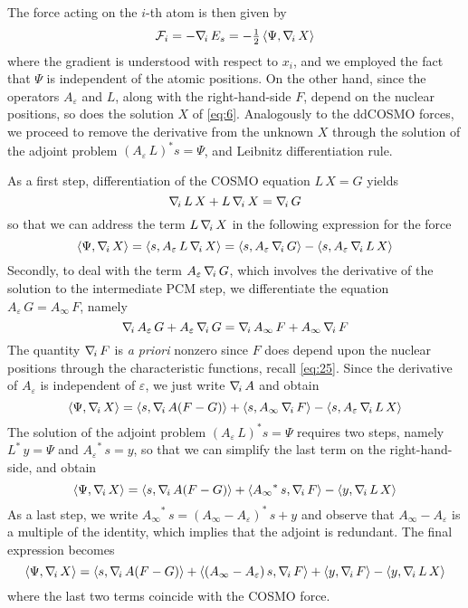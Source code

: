 The force acting on the $i$-th atom is then given by
\[
\mathcal{F}_i = -\nabla_{\!i}\, E_s = - \tfrac{1}{2} 
\,  \langle \Psi, \nabla_{\!i}\, X \rangle 
\]
where the gradient is understood with respect to $x_i$, and we employed the fact that $\Psi$ is independent of the atomic positions. On the other hand, since the operators $A_\varepsilon$ and $L$, along with the right-hand-side $F$, depend on the nuclear positions, so does the solution $X$ of \eqref{eq:6}. Analogously to the ddCOSMO forces, we proceed to remove the derivative from the unknown $X$ through the solution of the adjoint problem $(A_\varepsilon \, L)^* s = \Psi$, and Leibnitz differentiation rule.

As a first step, differentiation of the COSMO equation $L\, X = G$ yields
\[
\nabla_{\!i}\, L \, X + L \, \nabla_{\!i}\, X = \nabla_{\!i}\, G
\]
so that we can address the term $L \, \nabla_{\!i}\, X$ in the following expression for the force
\[
\langle \Psi , \nabla_{\!i}\, X\rangle  = \langle s ,  A_\varepsilon \, L \, \nabla_{\!i}\, X\rangle
 = \langle s ,  A_\varepsilon \, \nabla_{\!i}\, G \rangle - \langle s , A_\varepsilon \, \nabla_{\!i}\, L \,  X \rangle
\]
Secondly, to deal with the term $A_\varepsilon \, \nabla_{\!i}\, G$, which involves the derivative of the solution to the intermediate PCM step, we differentiate the equation $A_\varepsilon \, G = A_\infty \, F$, namely
\[
\nabla_{\!i}\, A_\varepsilon \, G + A_\varepsilon \, \nabla_{\!i}\, G = \nabla_{\!i}\, A_\infty \, F + A_\infty \, \nabla_{\!i}\, F
\]
The quantity $\nabla_{\!i}\, F$ is \emph{a priori} nonzero since $F$ does depend upon the nuclear positions through the characteristic functions, recall \eqref{eq:25}. Since the derivative of $A_\varepsilon$ is independent of $\varepsilon$, we just write $\nabla_{\!i}\, A$ and obtain
\[
\langle \Psi , \nabla_{\!i}\, X\rangle = \langle s , \nabla_{\!i}\,  A ( F - G ) \rangle + \langle  s ,{A_\infty}\, \nabla_{\!i}\, F \rangle - \langle  s , {A_\varepsilon}\, \nabla_{\!i}\, L \,  X \rangle
\]
The solution of the adjoint problem $(A_\varepsilon \, L )^* s = \Psi$ requires two steps, namely ${L}^* \, y = \Psi$ and ${A_\varepsilon}^* \, s = y$, so that we can simplify the last term on the right-hand-side, and obtain
\[
\langle \Psi , \nabla_{\!i}\, X\rangle = \langle s , \nabla_{\!i}\,  A ( F - G ) \rangle + \langle {A_\infty}^*\, s , \nabla_{\!i}\, F \rangle - \langle  y , \nabla_{\!i}\, L \,  X \rangle
\]
{\color{red}
As a last step, we write ${A_\infty}^*\, s = ({A_\infty}-{A_\varepsilon})^*\, s + y$ and observe that ${A_\infty}-{A_\varepsilon} $ is a multiple of the identity, which implies that the adjoint is redundant. The final expression becomes
\[
\langle \Psi , \nabla_{\!i}\, X\rangle = \langle s , \nabla_{\!i}\,  A ( F - G ) \rangle + \langle ({A_\infty}-{A_\varepsilon})\, s, \nabla_{\!i}\, F \rangle +\langle y , \nabla_{\!i}\, F \rangle - \langle  y , \nabla_{\!i}\, L \,  X \rangle
\]
where the last two terms coincide with the COSMO force.}

